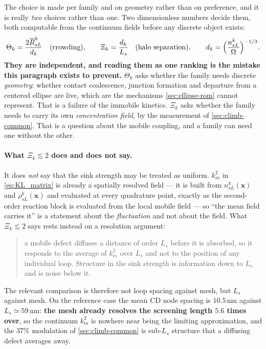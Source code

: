 \documentclass{article}
\begin{document}
The choice is made per family and on geometry rather than on preference, and it
is really \emph{two} choices rather than one. Two dimensionless numbers decide
them, both computable from the continuum fields before any discrete object
exists:
\begin{equation}
  \Theta_k=\frac{2\overline R^k_{sL}}{d_k}\quad\text{(crowding)},
  \qquad
  \Xi_k=\frac{d_k}{L_s}\quad\text{(halo separation)},
  \qquad
  d_k=\Bigl(\frac{n^k_{sL}}{\Omega}\Bigr)^{-1/3}.
  \label{eq:selectors}
\end{equation}
\textbf{They are independent, and reading them as one ranking is the mistake this
paragraph exists to prevent.} $\Theta_k$ asks whether the family needs discrete
\emph{geometry}: whether contact coalescence, junction formation and departure
from a centered ellipse are live, which are the mechanisms \cref{sec:ellipse-rom}
cannot represent. That is a failure of the immobile kinetics. $\Xi_k$ asks
whether the family needs to carry its own \emph{concentration field}, by the
measurement of \cref{sec:climb-common}. That is a question about the mobile
coupling, and a family can need one without the other.

\paragraph{What $\Xi_k\lesssim2$ does and does not say.} It does \emph{not} say
that the sink strength may be treated as uniform. $k^2_m$ in \cref{eq:KL_matrix}
is already a spatially resolved field --- it is built from $n^k_{sL}(\bm x)$ and
$\rho^k_{sL}(\bm x)$ and evaluated at every quadrature point, exactly as the
second-order reaction block is evaluated from the local mobile field --- so
``the mean field carries it'' is a statement about the \emph{fluctuation} and not
about the field. What $\Xi_k\lesssim2$ says rests instead on a resolution
argument:

\begin{quote}
a mobile defect diffuses a distance of order $L_s$ before it is absorbed, so it
responds to the average of $k^2_m$ over $L_s$ and not to the position of any
individual loop. Structure in the sink strength is information down to $L_s$ and
is noise below it.
\end{quote}

The relevant comparison is therefore not loop spacing against mesh, but $L_s$
against mesh. On the reference case the mean CD node spacing is $10.5$\,nm
against $L_s\simeq59$\,nm: \textbf{the mesh already resolves the screening length
$5.6$ times over}, so the continuum $k^2_m$ is nowhere near being the limiting
approximation, and the $37\%$ modulation of \cref{sec:climb-common} is
sub-$L_s$ structure that a diffusing defect averages away.
\end{document}
